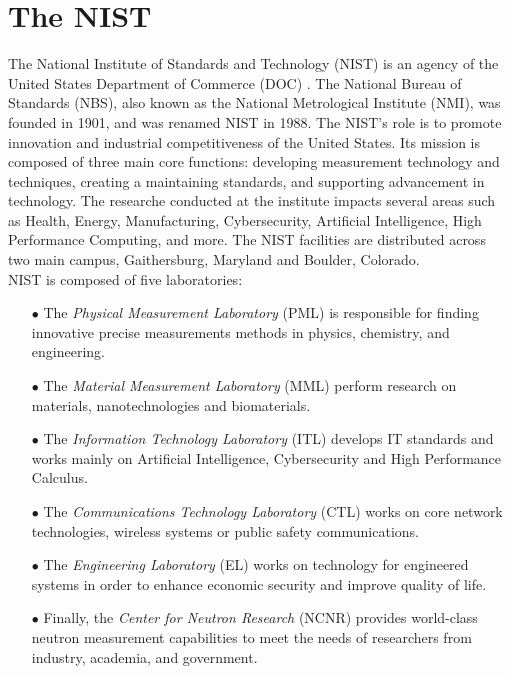 
\section{The NIST}

The National Institute of Standards and Technology (NIST) is an agency of the
United States Department of Commerce (DOC) \cite{enwiki:nist}. The National
Bureau of Standards (NBS), also known as the National Metrological Institute
(NMI), was founded in 1901, and was renamed NIST in 1988. The NIST's role is to
promote innovation and industrial competitiveness of the United States. Its
mission is composed of three main core functions: developing measurement
technology and techniques, creating a maintaining standards, and supporting
advancement in technology. The researche conducted at the institute impacts
several areas such as Health, Energy, Manufacturing, Cybersecurity, Artificial
Intelligence, High Performance Computing, and more. The NIST facilities are
distributed across two main campus, Gaithersburg, Maryland and Boulder,
Colorado.\\

NIST is composed of five laboratories:

\begin{itemize}
  \item[$\bullet$] The \textit{Physical Measurement Laboratory} (PML) is responsible for
    finding innovative precise measurements methods in physics, chemistry, and
    engineering.

  \item[$\bullet$] The \textit{Material Measurement Laboratory} (MML) perform research on
    materials, nanotechnologies and biomaterials.

  \item[$\bullet$] The \textit{Information Technology Laboratory} (ITL) develops IT
    standards and works mainly on Artificial Intelligence, Cybersecurity and
    High Performance Calculus.

  \item[$\bullet$] The \textit{Communications Technology Laboratory} (CTL) works on core
    network technologies, wireless systems or public safety communications.

  \item[$\bullet$] The \textit{Engineering Laboratory} (EL) works on technology for
    engineered systems in order to enhance economic security and improve quality
    of life.

  \item[$\bullet$] Finally, the \textit{Center for Neutron Research} (NCNR) provides
    world-class neutron measurement capabilities to meet the needs of
    researchers from industry, academia, and government.
\end{itemize}

